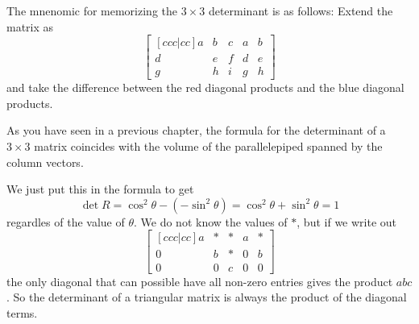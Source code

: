 \begin{remark}
	The mnenomic for memorizing the $3\times 3$ determinant is as follows:
	Extend the matrix as \[
	\begin{bmatrix}[ccc|cc]
		a&b&c&a&b\\d&e&f&d&e\\g&h&i&g&h
	\end{bmatrix}
	\]
	and take the difference between the red diagonal products and the blue diagonal products.
	\begin{figure}[h]
		\centering
	\end{figure}
	
\end{remark}
As you have seen in a previous chapter, the formula for the determinant of a $3\times 3$ matrix coincides with the volume of the parallelepiped spanned by the column vectors.


We just put this in the formula to get \[
	\det R = \cos^2\theta - (-\sin^2\theta) = \cos^2\theta + \sin^2\theta = 1
\]
regardles of the value of $\theta$.
We do not know the values of $*$, but if we write out \[
	\begin{bmatrix}[ccc|cc]
		a&*&*&a&*\\0&b&*&0&b\\0&0&c&0&0
	\end{bmatrix}\]
the only diagonal that can possible have all non-zero entries gives the product $abc$. So the determinant of a triangular matrix is always the product of the diagonal terms.
